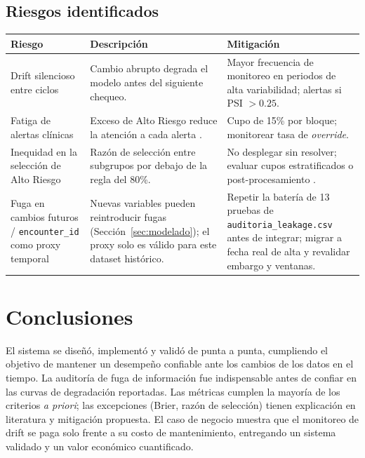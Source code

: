 \documentclass[11pt,a4paper]{article}
\begin{document}
\subsection{Riesgos identificados}

{\small
\begin{longtable}{p{2.9cm}p{4.7cm}p{4.9cm}}
\toprule
\textbf{Riesgo} & \textbf{Descripción} & \textbf{Mitigación} \\
\midrule
\endhead
Drift silencioso entre ciclos & Cambio abrupto degrada el modelo antes del siguiente chequeo. & Mayor frecuencia de monitoreo en periodos de alta variabilidad; alertas si PSI $>0.25$. \\
Fatiga de alertas clínicas & Exceso de Alto Riesgo reduce la atención a cada alerta \cite{vandersijs2006}. & Cupo de 15\% por bloque; monitorear tasa de \emph{override}. \\
Inequidad en la selección de Alto Riesgo & Razón de selección entre subgrupos por debajo de la regla del 80\%. & No desplegar sin resolver; evaluar cupos estratificados o post-procesamiento \cite{hardt2016}. \\
Fuga en cambios futuros / \texttt{encounter\_id} como proxy temporal & Nuevas variables pueden reintroducir fugas (Sección~\ref{sec:modelado}); el proxy solo es válido para este dataset histórico. & Repetir la batería de 13 pruebas de \texttt{auditoria\_leakage.csv} antes de integrar; migrar a fecha real de alta y revalidar embargo y ventanas. \\
\bottomrule
\end{longtable}}

\section{Conclusiones}

El sistema se diseñó, implementó y validó de punta a punta, cumpliendo el objetivo de mantener un desempeño confiable ante los cambios de los datos en el tiempo. La auditoría de fuga de información fue indispensable antes de confiar en las curvas de degradación reportadas. Las métricas cumplen la mayoría de los criterios \emph{a priori}; las excepciones (Brier, razón de selección) tienen explicación en literatura y mitigación propuesta. El caso de negocio muestra que el monitoreo de drift se paga solo frente a su costo de mantenimiento, entregando un sistema validado y un valor económico cuantificado.
\end{document}
